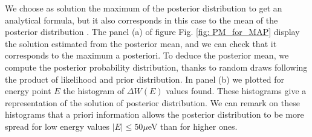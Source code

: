 We choose as solution the maximum of the posterior distribution to get an analytical formula, but it also corresponds in this case to the mean of the posterior distribution \cite{bardsley2012mcmc} \cite{howard2014sampling}. The panel (a) of figure Fig. \ref{fig: PM_for_MAP} display the solution estimated from the posterior mean, and we can check that it corresponds to the maximum a posteriori. To deduce the posterior mean, we compute the posterior probability distribution, thanks to random draws following the product of likelihood and prior distribution. In panel (b) we plotted for energy point $E$ the histogram of $\Delta W\left(E\right)$ values found. These histograms give a representation of the solution of posterior distribution. We can remark on these histograms that a priori information allows the posterior distribution to be more spread for low energy values $|E|\leq 50 \mu$eV than for higher ones.

